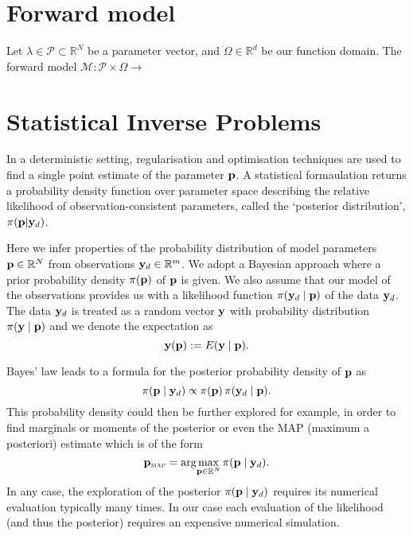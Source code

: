 \section{Forward model}
Let $\lambda \in \mathcal{P} \subset \mathbb{R}^N$ be a parameter vector, and $\Omega \in \mathbb{R}^d$ be our function domain. The forward model $\mathcal{M}: \mathcal{P}\times \Omega \rightarrow $

\section{Statistical Inverse Problems}
In a deterministic setting, regularisation and optimisation techniques are used to find a single point estimate of the parameter ${\mathbf{p}}$. A statistical formaulation returns a probability density function over parameter space describing the relative likelihood of observation-consistent parameters, called the `posterior distribution', $\pi({\mathbf{p}}| {\mathbf{y}}_d)$.

Here we infer properties of the probability distribution of model parameters ${\mathbf{p}}\in{\mathbb R}^N$ 
from observations ${\mathbf{y}}_d\in{\mathbb R}^m$. 
We adopt a Bayesian approach where a prior probability density $\pi({\mathbf{p}})$ of ${\mathbf{p}}$ is given. 
We also assume that our model of the observations provides us with
a likelihood function $\pi({\mathbf{y}}_d\mid {\mathbf{p}})$ of the data ${\mathbf{y}}_d$. 
The data ${\mathbf{y}}_d$ is treated as a random vector ${\mathbf{y}}$ with probability distribution $\pi({\mathbf{y}}\mid {\mathbf{p}})$ and we denote the expectation as
\begin{equation*}
{\mathbf{y}}({\mathbf{p}}) := E({\mathbf{y}}\mid {\mathbf{p}}).
\end{equation*}

Bayes' law leads to a formula for the posterior probability density of ${\mathbf{p}}$ as
\begin{equation}\label{eqn:bayes}
\pi({\mathbf{p}}\mid {\mathbf{y}}_d) \propto \pi({\mathbf{p}})\,\pi({\mathbf{y}}_d\mid {\mathbf{p}}).
\end{equation}
This probability density could then be further explored for example, in order to find marginals or
moments of the posterior or even the MAP (maximum a posteriori) estimate which is of the form
\begin{equation}\label{eqn:PMAPfull}
{\mathbf{p}}_{\operatorname{\textsc{map}}} = \arg\!\max_{{\mathbf{p}}\in{\mathbb R}^N} \pi({\mathbf{p}}\mid {\mathbf{y}}_d).
\end{equation}
In any case, the exploration of the posterior $\pi({\mathbf{p}}\mid {\mathbf{y}}_d)$ requires its numerical evaluation typically many times. 
In our case each evaluation of the likelihood (and thus the posterior) 
requires an expensive numerical simulation.

